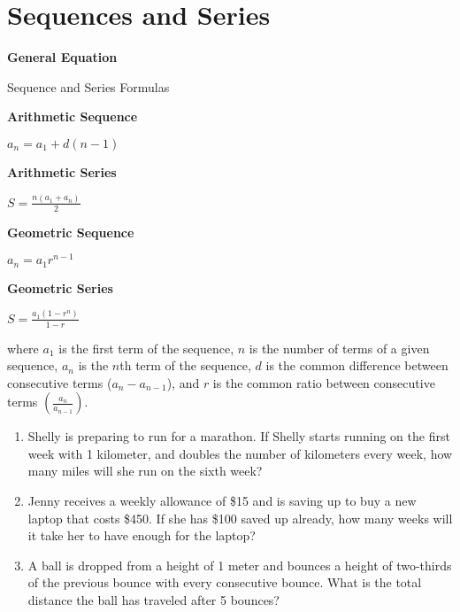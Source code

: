 \section{Sequences and Series}

\bigskip
\textbf{General Equation}

\bigskip
\begin{equationbox}{Sequence and Series Formulas}
\setlength{\columnseprule}{0pt}
\begin{center}
\begin{multicols}{2}

\textbf{Arithmetic Sequence}


$a_n=a_1+d(n-1)$

\vspace{2em}
\textbf{Arithmetic Series}

\medskip
$S=\frac{n(a_1+a_n)}{2}$

\columnbreak
\textbf{Geometric Sequence}

\smallskip
$a_n=a_1r^{n-1}$

\vspace{2em}
\textbf{Geometric Series}

\medskip
$S=\frac{a_1(1-r^n)}{1-r}$
\end{multicols}
\end{center}
\end{equationbox}

where $a_1$ is the first term of the sequence, $n$ is the number of terms of a given sequence, $a_n$ is the $n$th term of the sequence, $d$ is the common difference between consecutive terms ($a_n-a_{n-1}$), and $r$ is the common ratio between consecutive terms $\left(\frac{a_n}{a_{n-1}}\right)$.

\vspace{1em}
\begin{enumerate}[labelindent=*,style=multiline,leftmargin=*,label=\textbf{Example \arabic*:}]
\item Shelly is preparing to run for a marathon. If Shelly starts running on the first week with 1 kilometer, and doubles the number of kilometers every week, how many miles will she run on the sixth week?

\vfill\item Jenny receives a weekly allowance of \$15 and is saving up to buy a new laptop that costs \$450. If she has \$100 saved up already, how many weeks will it take her to have enough for the laptop?

\vfill\item A ball is dropped from a height of 1 meter and bounces a height of two-thirds of the previous bounce with every consecutive bounce. What is the total distance the ball has traveled after 5 bounces?
\end{enumerate}

